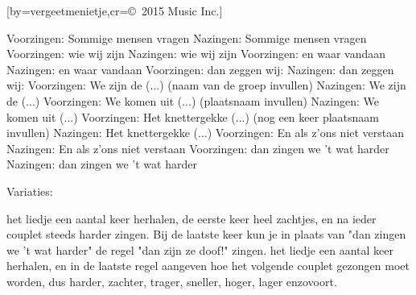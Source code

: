  

[by=vergeetmenietje,cr={\copyright~2015 Music Inc.}]




\beginverse
Voorzingen: Sommige mensen vragen
Nazingen: Sommige mensen vragen
Voorzingen: wie wij zijn
Nazingen: wie wij zijn
Voorzingen: en waar vandaan
Nazingen: en waar vandaan
Voorzingen: dan zeggen wij:
Nazingen: dan zeggen wij:
Voorzingen: We zijn de (...) (naam van de groep invullen)
Nazingen: We zijn de (...)
Voorzingen: We komen uit (...) (plaatsnaam invullen)
Nazingen: We komen uit (...)
Voorzingen: Het knettergekke (...) (nog een keer plaatsnaam invullen)
Nazingen: Het knettergekke (...)
Voorzingen: En als z'ons niet verstaan
Nazingen: En als z'ons niet verstaan
Voorzingen: dan zingen we 't wat harder
Nazingen: dan zingen we 't wat harder


Variaties:

    het liedje een aantal keer herhalen, de eerste keer heel zachtjes, en na ieder couplet steeds harder zingen. Bij de laatste keer kun je in plaats van "dan zingen we 't wat harder" de regel "dan zijn ze doof!" zingen.
    het liedje een aantal keer herhalen, en in de laatste regel aangeven hoe het volgende couplet gezongen moet worden, dus harder, zachter, trager, sneller, hoger, lager enzovoort.
\endverse




\endsong
